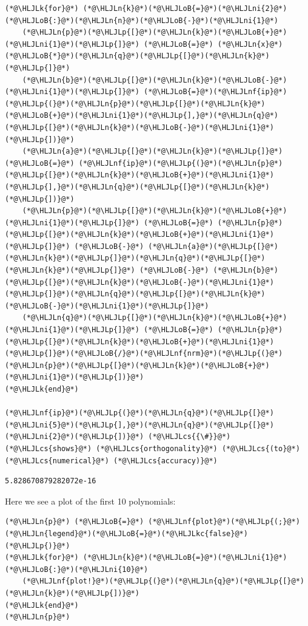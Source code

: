 \documentclass[12pt,a4paper]{article}
\newcommand{\HLJLk}[1]{\textcolor[RGB]{148,91,176}{\textbf{#1}}}
\newcommand{\HLJLkc}[1]{\textcolor[RGB]{59,151,46}{\textit{#1}}}
\newcommand{\HLJLn}[1]{#1}
\newcommand{\HLJLnf}[1]{\textcolor[RGB]{66,102,213}{#1}}
\newcommand{\HLJLni}[1]{\textcolor[RGB]{59,151,46}{#1}}
\newcommand{\HLJLoB}[1]{\textcolor[RGB]{102,102,102}{\textbf{#1}}}
\newcommand{\HLJLp}[1]{#1}
\newcommand{\HLJLcs}[1]{\textcolor[RGB]{153,153,119}{\textit{#1}}}
\begin{document}
\begin{lstlisting}
(*@\HLJLk{for}@*) (*@\HLJLn{k}@*)(*@\HLJLoB{=}@*)(*@\HLJLni{2}@*)(*@\HLJLoB{:}@*)(*@\HLJLn{n}@*)(*@\HLJLoB{-}@*)(*@\HLJLni{1}@*)
    (*@\HLJLn{p}@*)(*@\HLJLp{[}@*)(*@\HLJLn{k}@*)(*@\HLJLoB{+}@*)(*@\HLJLni{1}@*)(*@\HLJLp{]}@*) (*@\HLJLoB{=}@*) (*@\HLJLn{x}@*)(*@\HLJLoB{*}@*)(*@\HLJLn{q}@*)(*@\HLJLp{[}@*)(*@\HLJLn{k}@*)(*@\HLJLp{]}@*) 
    (*@\HLJLn{b}@*)(*@\HLJLp{[}@*)(*@\HLJLn{k}@*)(*@\HLJLoB{-}@*)(*@\HLJLni{1}@*)(*@\HLJLp{]}@*) (*@\HLJLoB{=}@*)(*@\HLJLnf{ip}@*)(*@\HLJLp{(}@*)(*@\HLJLn{p}@*)(*@\HLJLp{[}@*)(*@\HLJLn{k}@*)(*@\HLJLoB{+}@*)(*@\HLJLni{1}@*)(*@\HLJLp{],}@*)(*@\HLJLn{q}@*)(*@\HLJLp{[}@*)(*@\HLJLn{k}@*)(*@\HLJLoB{-}@*)(*@\HLJLni{1}@*)(*@\HLJLp{])}@*)
    (*@\HLJLn{a}@*)(*@\HLJLp{[}@*)(*@\HLJLn{k}@*)(*@\HLJLp{]}@*) (*@\HLJLoB{=}@*) (*@\HLJLnf{ip}@*)(*@\HLJLp{(}@*)(*@\HLJLn{p}@*)(*@\HLJLp{[}@*)(*@\HLJLn{k}@*)(*@\HLJLoB{+}@*)(*@\HLJLni{1}@*)(*@\HLJLp{],}@*)(*@\HLJLn{q}@*)(*@\HLJLp{[}@*)(*@\HLJLn{k}@*)(*@\HLJLp{])}@*)
    (*@\HLJLn{p}@*)(*@\HLJLp{[}@*)(*@\HLJLn{k}@*)(*@\HLJLoB{+}@*)(*@\HLJLni{1}@*)(*@\HLJLp{]}@*) (*@\HLJLoB{=}@*) (*@\HLJLn{p}@*)(*@\HLJLp{[}@*)(*@\HLJLn{k}@*)(*@\HLJLoB{+}@*)(*@\HLJLni{1}@*)(*@\HLJLp{]}@*) (*@\HLJLoB{-}@*) (*@\HLJLn{a}@*)(*@\HLJLp{[}@*)(*@\HLJLn{k}@*)(*@\HLJLp{]}@*)(*@\HLJLn{q}@*)(*@\HLJLp{[}@*)(*@\HLJLn{k}@*)(*@\HLJLp{]}@*) (*@\HLJLoB{-}@*) (*@\HLJLn{b}@*)(*@\HLJLp{[}@*)(*@\HLJLn{k}@*)(*@\HLJLoB{-}@*)(*@\HLJLni{1}@*)(*@\HLJLp{]}@*)(*@\HLJLn{q}@*)(*@\HLJLp{[}@*)(*@\HLJLn{k}@*)(*@\HLJLoB{-}@*)(*@\HLJLni{1}@*)(*@\HLJLp{]}@*)
    (*@\HLJLn{q}@*)(*@\HLJLp{[}@*)(*@\HLJLn{k}@*)(*@\HLJLoB{+}@*)(*@\HLJLni{1}@*)(*@\HLJLp{]}@*) (*@\HLJLoB{=}@*) (*@\HLJLn{p}@*)(*@\HLJLp{[}@*)(*@\HLJLn{k}@*)(*@\HLJLoB{+}@*)(*@\HLJLni{1}@*)(*@\HLJLp{]}@*)(*@\HLJLoB{/}@*)(*@\HLJLnf{nrm}@*)(*@\HLJLp{(}@*)(*@\HLJLn{p}@*)(*@\HLJLp{[}@*)(*@\HLJLn{k}@*)(*@\HLJLoB{+}@*)(*@\HLJLni{1}@*)(*@\HLJLp{])}@*)
(*@\HLJLk{end}@*)

(*@\HLJLnf{ip}@*)(*@\HLJLp{(}@*)(*@\HLJLn{q}@*)(*@\HLJLp{[}@*)(*@\HLJLni{5}@*)(*@\HLJLp{],}@*)(*@\HLJLn{q}@*)(*@\HLJLp{[}@*)(*@\HLJLni{2}@*)(*@\HLJLp{])}@*) (*@\HLJLcs{{\#}}@*) (*@\HLJLcs{shows}@*) (*@\HLJLcs{orthogonality}@*) (*@\HLJLcs{(to}@*) (*@\HLJLcs{numerical}@*) (*@\HLJLcs{accuracy)}@*)
\end{lstlisting}

\begin{lstlisting}
5.828670879282072e-16
\end{lstlisting}


Here we see a plot of the first 10 polynomials:


\begin{lstlisting}
(*@\HLJLn{p}@*) (*@\HLJLoB{=}@*) (*@\HLJLnf{plot}@*)(*@\HLJLp{(;}@*) (*@\HLJLn{legend}@*)(*@\HLJLoB{=}@*)(*@\HLJLkc{false}@*)(*@\HLJLp{)}@*)
(*@\HLJLk{for}@*) (*@\HLJLn{k}@*)(*@\HLJLoB{=}@*)(*@\HLJLni{1}@*)(*@\HLJLoB{:}@*)(*@\HLJLni{10}@*)
    (*@\HLJLnf{plot!}@*)(*@\HLJLp{(}@*)(*@\HLJLn{q}@*)(*@\HLJLp{[}@*)(*@\HLJLn{k}@*)(*@\HLJLp{])}@*)
(*@\HLJLk{end}@*)
(*@\HLJLn{p}@*)
\end{lstlisting}
\end{document}

